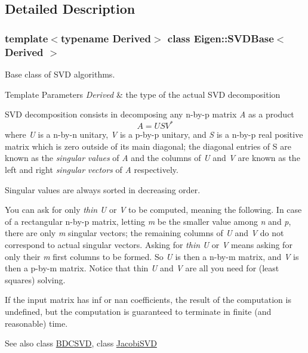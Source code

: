 \subsection{Detailed Description}
\subsubsection*{template$<$typename Derived$>$\newline
class Eigen\+::\+S\+V\+D\+Base$<$ Derived $>$}

Base class of S\+VD algorithms. 


\begin{DoxyTemplParams}{Template Parameters}
{\em Derived} & the type of the actual S\+VD decomposition\\
\hline
\end{DoxyTemplParams}
S\+VD decomposition consists in decomposing any n-\/by-\/p matrix {\itshape A} as a product \[ A = U S V^* \] where {\itshape U} is a n-\/by-\/n unitary, {\itshape V} is a p-\/by-\/p unitary, and {\itshape S} is a n-\/by-\/p real positive matrix which is zero outside of its main diagonal; the diagonal entries of S are known as the {\itshape singular} {\itshape values} of {\itshape A} and the columns of {\itshape U} and {\itshape V} are known as the left and right {\itshape singular} {\itshape vectors} of {\itshape A} respectively.

Singular values are always sorted in decreasing order.

You can ask for only {\itshape thin} {\itshape U} or {\itshape V} to be computed, meaning the following. In case of a rectangular n-\/by-\/p matrix, letting {\itshape m} be the smaller value among {\itshape n} and {\itshape p}, there are only {\itshape m} singular vectors; the remaining columns of {\itshape U} and {\itshape V} do not correspond to actual singular vectors. Asking for {\itshape thin} {\itshape U} or {\itshape V} means asking for only their {\itshape m} first columns to be formed. So {\itshape U} is then a n-\/by-\/m matrix, and {\itshape V} is then a p-\/by-\/m matrix. Notice that thin {\itshape U} and {\itshape V} are all you need for (least squares) solving.

If the input matrix has inf or nan coefficients, the result of the computation is undefined, but the computation is guaranteed to terminate in finite (and reasonable) time. \begin{DoxySeeAlso}{See also}
class \mbox{\hyperlink{class_eigen_1_1_b_d_c_s_v_d}{B\+D\+C\+S\+VD}}, class \mbox{\hyperlink{class_eigen_1_1_jacobi_s_v_d}{Jacobi\+S\+VD}} 
\end{DoxySeeAlso}


